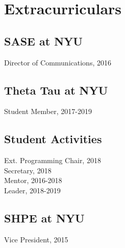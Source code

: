 \documentclass[]{deedy-resume-openfont}
\begin{document}
\begin{minipage}[t]{0.33\textwidth}

\section{Extracurriculars}

\subsection{SASE at NYU}
Director of Communications, 2016\\
\sectionsep

\subsection{Theta Tau at NYU}

Student Member, 2017-2019
\sectionsep

\subsection{Student Activities}
Ext. Programming Chair, 2018\\
Secretary, 2018 \\
Mentor, 2016-2018\\
Leader, 2018-2019
\sectionsep

\subsection{SHPE at NYU}
Vice President, 2015\\

\sectionsep



%
%

\end{minipage} 
\hfill
\end{document}
